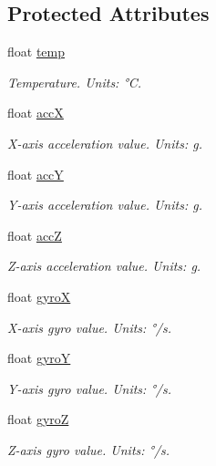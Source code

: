 \subsection*{Protected Attributes}
\begin{DoxyCompactItemize}
\item 
float \hyperlink{class_loom___m_p_u6050_af9c5eb7e6a657f92500dd39df03383b3}{temp}
\begin{DoxyCompactList}\small\item\em Temperature. Units\+: °C. \end{DoxyCompactList}\item 
float \hyperlink{class_loom___m_p_u6050_abe1855f17309051bcecddf084a7f2a95}{accX}
\begin{DoxyCompactList}\small\item\em X-\/axis acceleration value. Units\+: g. \end{DoxyCompactList}\item 
float \hyperlink{class_loom___m_p_u6050_a12e89f1a6d8e9564600e6e85375abca9}{accY}
\begin{DoxyCompactList}\small\item\em Y-\/axis acceleration value. Units\+: g. \end{DoxyCompactList}\item 
float \hyperlink{class_loom___m_p_u6050_a7d9d3324a3b3bf58f6a11993e8d28b61}{accZ}
\begin{DoxyCompactList}\small\item\em Z-\/axis acceleration value. Units\+: g. \end{DoxyCompactList}\item 
float \hyperlink{class_loom___m_p_u6050_afd0b222a584ee71d922532ac12763f9a}{gyroX}
\begin{DoxyCompactList}\small\item\em X-\/axis gyro value. Units\+: °/s. \end{DoxyCompactList}\item 
float \hyperlink{class_loom___m_p_u6050_a1edb0ae9dd59317f4c1aafad72f3d5ef}{gyroY}
\begin{DoxyCompactList}\small\item\em Y-\/axis gyro value. Units\+: °/s. \end{DoxyCompactList}\item 
float \hyperlink{class_loom___m_p_u6050_a0e8122d20fc6e686e2952e93e1ff1a89}{gyroZ}
\begin{DoxyCompactList}\small\item\em Z-\/axis gyro value. Units\+: °/s. \end{DoxyCompactList}\item 

\end{DoxyCompactItemize}
